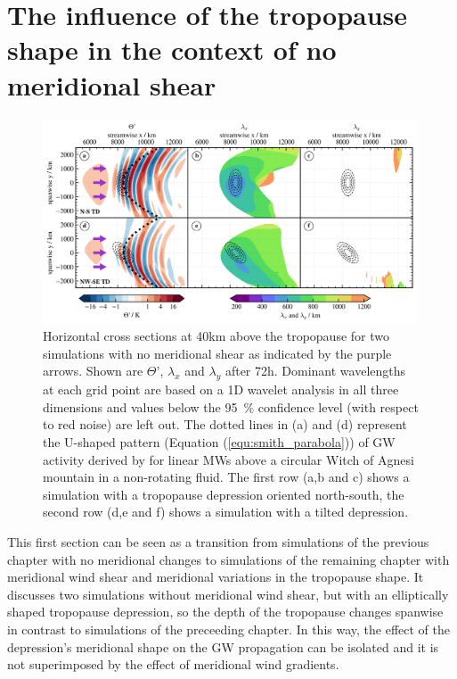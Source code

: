\section{The influence of the tropopause shape in the context of no meridional shear}
\label{sec:3D_noshear}
\begin{figure}[t]
    \centering
    \includegraphics[width=0.99\textwidth]{figures_3D/waveletAna_overview_noShear.png}
    \caption{Horizontal cross sections at 40km above the tropopause for two simulations with no meridional shear as indicated by the purple arrows. Shown are $\Theta$', $\lambda_x$ and $\lambda_y$ after 72h. Dominant wavelengths at each grid point are based on a 1D wavelet analysis in all three dimensions and values below the \SI{95}{\percent} confidence level (with respect to red noise) are left out. The dotted lines in (a) and (d) represent the U-shaped pattern (Equation (\ref{equ:smith_parabola})) of GW activity derived by \textcite[]{smith_linear_1980} for linear MWs above a circular Witch of Agnesi mountain in a non-rotating fluid. The first row (a,b and c) shows a simulation with a tropopause depression oriented north-south, the second row (d,e and f) shows a simulation with a tilted depression.}
    \label{fig:waveletAna_noShear}
\end{figure}
This first section can be seen as a transition from simulations of the previous chapter with no meridional changes to simulations of the remaining chapter with meridional wind shear and meridional variations in the tropopause shape. It discusses two simulations without meridional wind shear, but with an elliptically shaped tropopause depression, so the depth of the tropopause changes spanwise in contrast to simulations of the preceeding chapter. In this way, the effect of the depression's meridional shape on the GW propagation can be isolated and it is not superimposed by the effect of meridional wind gradients.\\
